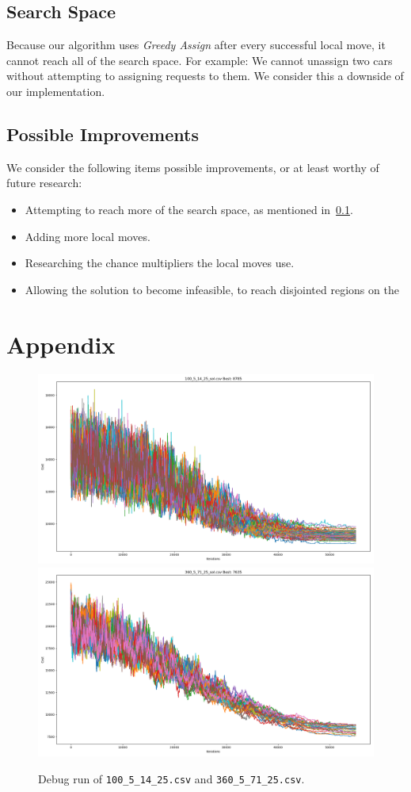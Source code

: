 \documentclass[11pt,a4paper]{article}
\begin{document}
    \subsection{Search Space}\label{subsec:search-space}
        Because our algorithm uses \textit{Greedy Assign} after every successful local move, it cannot reach all of the search space.
        For example: We cannot unassign two cars without attempting to assigning requests to them.
        We consider this a downside of our implementation.

    \subsection{Possible Improvements}\label{subsec:possible-improvements}
        We consider the following items possible improvements, or at least worthy of future research:
        \begin{itemize} \itemsep-0.25em
            \item Attempting to reach more of the search space, as mentioned in~\ref{subsec:search-space}.
            \item Adding more local moves.
            \item Researching the chance multipliers the local moves use.
            \item Allowing the solution to become infeasible, to reach disjointed regions on the
        \end{itemize}


\pagebreak\section{Appendix}\label{sec:appendix}

\begin{figure}[ht]
    \centering
    \includegraphics[width=\textwidth]{../img/100_5_14_25.png}
\includegraphics[width=\textwidth]{../img/360_5_71_25.png}
    \caption{Debug run of \texttt{100\_5\_14\_25.csv} and \texttt{360\_5\_71\_25.csv}.}
    \label{fig:graph}
\end{figure}
\end{document}
